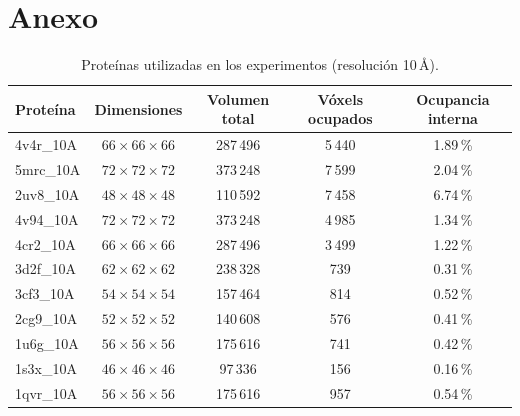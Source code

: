 
\chapter{Anexo}

\begin{table}[h]
\centering
\label{tab:proteinas}
\begin{tabular}{lcccc}
\toprule
\textbf{Proteína} & \textbf{Dimensiones} & \textbf{Volumen total} & \textbf{Vóxels ocupados} & \textbf{Ocupancia interna} \\
    \midrule
    4v4r\_10A & $66 \times 66 \times 66$ & 287\,496 & 5\,440 & 1.89\,\% \\
    5mrc\_10A & $72 \times 72 \times 72$ & 373\,248 & 7\,599 & 2.04\,\% \\
    2uv8\_10A & $48 \times 48 \times 48$ & 110\,592 & 7\,458 & 6.74\,\% \\
    4v94\_10A & $72 \times 72 \times 72$ & 373\,248 & 4\,985 & 1.34\,\% \\
    4cr2\_10A & $66 \times 66 \times 66$ & 287\,496 & 3\,499 & 1.22\,\% \\
    3d2f\_10A & $62 \times 62 \times 62$ & 238\,328 &    739 & 0.31\,\% \\
    3cf3\_10A & $54 \times 54 \times 54$ & 157\,464 &    814 & 0.52\,\% \\
    2cg9\_10A & $52 \times 52 \times 52$ & 140\,608 &    576 & 0.41\,\% \\
    1u6g\_10A & $56 \times 56 \times 56$ & 175\,616 &    741 & 0.42\,\% \\
    1s3x\_10A & $46 \times 46 \times 46$ &  97\,336 &    156 & 0.16\,\% \\
    1qvr\_10A & $56 \times 56 \times 56$ & 175\,616 &    957 & 0.54\,\% \\
    \bottomrule
\end{tabular}
\caption{Proteínas utilizadas en los experimentos (resolución 10\,\AA).}
\end{table}


